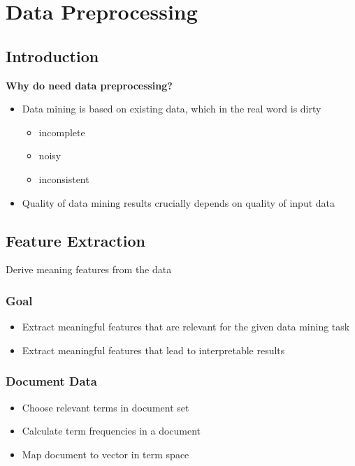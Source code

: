 \documentclass[../notes.tex]{subfiles}
\begin{document}
\section{Data Preprocessing}

\subsection{Introduction}
\textbf{Why do need data preprocessing?}

\begin{itemize}
  \item Data mining is based on existing data, which in the real word is dirty
  \begin{itemize}
    \item incomplete
    \item noisy
    \item inconsistent
  \end{itemize}

  \item Quality of data mining results crucially depends on quality of input data
\end{itemize}

\subsection{Feature Extraction}
Derive meaning features from the data

\subsubsection{Goal}
\begin{itemize}
  \item Extract meaningful features that are relevant for the given data mining task
  \item Extract meaningful features that lead to interpretable results
\end{itemize}

\subsubsection{Document Data}
\begin{itemize}
  \item Choose relevant terms in document set
  \item Calculate term frequencies in a document
  \item Map document to vector in term space
\end{itemize}
\end{document}
